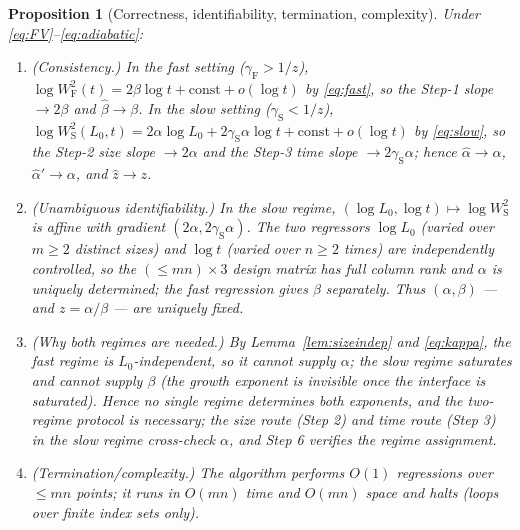 \documentclass{amsart}
\newtheorem{proposition}{Proposition}
\theoremstyle{definition}
\begin{document}
\begin{proposition}[Correctness, identifiability, termination, complexity]\label{prop:alg}
Under \eqref{eq:FV}--\eqref{eq:adiabatic}:
\begin{enumerate}
\item[\textnormal{(i)}] \emph{(Consistency.)} In the fast setting
  ($\gamma_{\mathrm F}>1/z$), $\log W^2_{\mathrm F}(t)=2\beta\log t+\text{const}+o(\log t)$
  by \eqref{eq:fast}, so the Step-1 slope $\to2\beta$ and $\hat\beta\to\beta$. In
  the slow setting ($\gamma_{\mathrm S}<1/z$),
  $\log W^2_{\mathrm S}(L_0,t)=2\alpha\log L_0+2\gamma_{\mathrm S}\alpha\log t+\text{const}+o(\log t)$
  by \eqref{eq:slow}, so the Step-2 size slope $\to2\alpha$ and the Step-3 time
  slope $\to2\gamma_{\mathrm S}\alpha$; hence $\hat\alpha\to\alpha$,
  $\hat\alpha'\to\alpha$, and $\hat z\to z$.
\item[\textnormal{(ii)}] \emph{(Unambiguous identifiability.)} In the slow regime,
  $(\log L_0,\log t)\mapsto\log W^2_{\mathrm S}$ is affine with gradient
  $(2\alpha,2\gamma_{\mathrm S}\alpha)$. The two regressors $\log L_0$ (varied over
  $m\ge2$ distinct sizes) and $\log t$ (varied over $n\ge2$ times) are
  independently controlled, so the $(\le mn)\times3$ design matrix has full column
  rank and $\alpha$ is uniquely determined; the fast regression gives $\beta$
  separately. Thus $(\alpha,\beta)$ — and $z=\alpha/\beta$ — are uniquely fixed.
\item[\textnormal{(iii)}] \emph{(Why both regimes are needed.)} By
  Lemma~\ref{lem:sizeindep} and \eqref{eq:kappa}, the fast regime is
  $L_0$-independent, so it cannot supply $\alpha$; the slow regime saturates and
  cannot supply $\beta$ (the growth exponent is invisible once the interface is
  saturated). Hence no single regime determines both exponents, and the two-regime
  protocol is necessary; the size route (Step 2) and time route (Step 3) in the
  slow regime cross-check $\alpha$, and Step 6 verifies the regime assignment.
\item[\textnormal{(iv)}] \emph{(Termination/complexity.)} The algorithm performs
  $O(1)$ regressions over $\le mn$ points; it runs in $O(mn)$ time and $O(mn)$
  space and halts (loops over finite index sets only).
\end{enumerate}
\end{proposition}
\end{document}
